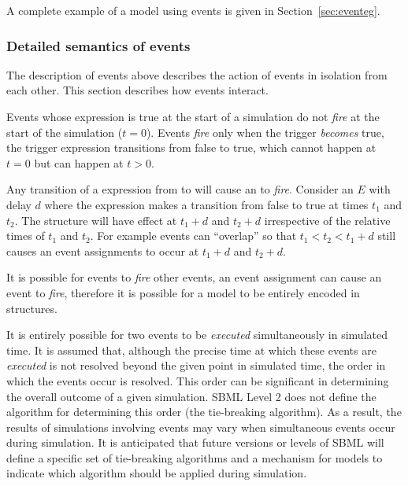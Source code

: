 A complete example of a model using events is given in
Section~\ref{sec:eventeg}.


\subsubsection{Detailed semantics of events}
\label{sec:events-semantics}

The description of events above describes the action of events in
isolation from each other.  This section describes how events
interact.

Events whose  expression is true at the start of a
simulation do not \emph{fire} at the start of the simulation ($t =
0$).  Events \emph{fire} only when the trigger \emph{becomes}
true, \ie the trigger expression transitions from false to true,
which cannot happen at $t = 0$ but can happen at $t > 0$.

Any transition of a  expression from  to
 will cause an  to \emph{fire}.  Consider
an  $E$ with delay $d$ where the 
expression makes a transition from false to true at times $t_1$
and $t_2$.  The \EventAssignment structure will have effect at
$t_1+d$ and $t_2+d$ irrespective of the relative times of $t_1$
and $t_2$. For example events can ``overlap'' so that $t_1 < t_2 <
t_1+d$ still causes an event assignments to occur at $t_1+d$ and
$t_2+d$.

It is possible for events to \emph{fire} other events, \ie an
event assignment can cause an event to \emph{fire}, therefore it
is possible for a model to be entirely encoded in \Event
structures.

It is entirely possible for two events to be \emph{executed}
simultaneously in simulated time.  It is assumed that, although
the precise time at which these events are \emph{executed} is not
resolved beyond the given point in simulated time, the order in
which the events occur is resolved.  This order can be significant
in determining the overall outcome of a given simulation. SBML
Level 2 does not define the algorithm for determining this order
(the tie-breaking algorithm).  As a result, the results of
simulations involving events may vary when simultaneous events
occur during simulation.  It is anticipated that future versions
or levels of SBML will define a specific set of tie-breaking
algorithms and a mechanism for models to indicate which algorithm
should be applied during simulation.

